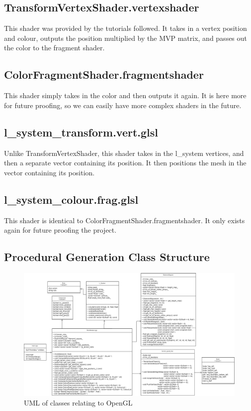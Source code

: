 \documentclass[a4paper,10pt]{report}
\begin{document}
\subsection{TransformVertexShader.vertexshader}
This shader was provided by the tutorials followed. It takes in a vertex position and colour, outputs the position multiplied by the MVP matrix, and passes out the color to the fragment shader.


\subsection{ColorFragmentShader.fragmentshader} This shader simply takes in the color and then outputs it again. It is here more for future proofing, so we can easily have more complex shaders in the future.  

\subsection{l\_system\_transform.vert.glsl}
Unlike TransformVertexShader, this shader takes in the l\_system vertices, and then a separate vector containing its position. It then positions the mesh in the vector containing its position.


\subsection{l\_system\_colour.frag.glsl}
This shader is identical to ColorFragmentShader.fragmentshader. It only exists again for future proofing the project. 


\clearpage
\subsection{Procedural Generation Class Structure}

\begin{figure}[h!]
\centering
  \includegraphics[width=1\textwidth]{Images/Charts/GenerationUML.png}
 \caption{UML of classes relating to OpenGL}
 \label{fig:GenerationUML}
\end{figure}
\end{document}
